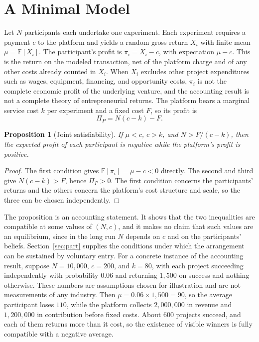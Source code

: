 \documentclass[11pt]{article}
\newtheorem{proposition}{Proposition}
\theoremstyle{remark}
\newcommand{\E}{\mathbb{E}}
\begin{document}
\section{A Minimal Model}\label{sec:model}

Let $N$ participants each undertake one experiment. Each experiment requires a payment $c$ to the platform and yields a random gross return $X_i$ with finite mean $\mu=\E[X_i]$. The participant's profit is $\pi_i = X_i - c$, with expectation $\mu - c$. This is the return on the modeled transaction, net of the platform charge and of any other costs already counted in $X_i$. When $X_i$ excludes other project expenditures such as wages, equipment, financing, and opportunity costs, $\pi_i$ is not the complete economic profit of the underlying venture, and the accounting result is not a complete theory of entrepreneurial returns. The platform bears a marginal service cost $k$ per experiment and a fixed cost $F$, so its profit is
\[
\Pi_P = N(c-k) - F .
\]

\begin{proposition}[Joint satisfiability]\label{prop:main}
If $\mu < c$, $c > k$, and $N > F/(c-k)$, then the expected profit of each participant is negative while the platform's profit is positive.
\end{proposition}

\begin{proof}
The first condition gives $\E[\pi_i]=\mu-c<0$ directly. The second and third give $N(c-k)>F$, hence $\Pi_P>0$. The first condition concerns the participants' returns and the others concern the platform's cost structure and scale, so the three can be chosen independently.
\end{proof}

The proposition is an accounting statement. It shows that the two inequalities are compatible at some values of $(N,c)$, and it makes no claim that such values are an equilibrium, since in the long run $N$ depends on $c$ and on the participants' beliefs. Section~\ref{sec:part} supplies the conditions under which the arrangement can be sustained by voluntary entry. For a concrete instance of the accounting result, suppose $N=10{,}000$, $c=200$, and $k=80$, with each project succeeding independently with probability $0.06$ and returning $1{,}500$ on success and nothing otherwise. These numbers are assumptions chosen for illustration and are not measurements of any industry. Then $\mu = 0.06\times 1{,}500 = 90$, so the average participant loses $110$, while the platform collects $2{,}000{,}000$ in revenue and $1{,}200{,}000$ in contribution before fixed costs. About $600$ projects succeed, and each of them returns more than it cost, so the existence of visible winners is fully compatible with a negative average.
\end{document}
